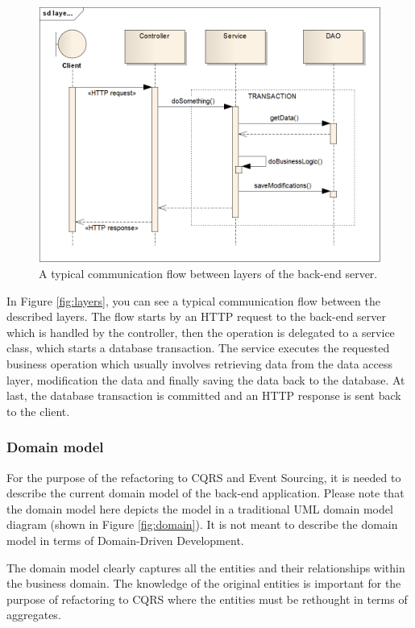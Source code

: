 \documentclass{book}
\begin{document}
\begin{figure}[h!]
\begin{center}
\includegraphics[width=0.7\columnwidth]{figures/layers/layers}
\caption{A typical communication flow between layers of the back-end server.%
}
\end{center}
\end{figure}

In Figure \ref{fig:layers}, you can see a typical communication flow
between the described layers. The flow starts by an HTTP request to the
back-end server which is handled by the controller, then the operation
is delegated to a service class, which starts a database transaction.
The service executes the requested business operation which usually
involves retrieving data from the data access layer, modification the
data and finally saving the data back to the database. At last, the
database transaction is committed and an HTTP response is sent back to
the client.


\subsubsection{Domain model}\label{domain-model}

For the purpose of the refactoring to CQRS and Event Sourcing, it is
needed to describe the current domain model of the back-end application.
Please note that the domain model here depicts the model in a
traditional UML domain model diagram (shown in Figure \ref{fig:domain}).
It is not meant to describe the domain model in terms of Domain-Driven
Development.

The domain model clearly captures all the entities and their
relationships within the business domain. The knowledge of the original
entities is important for the purpose of refactoring to CQRS where the
entities must be rethought in terms of aggregates.
\end{document}
